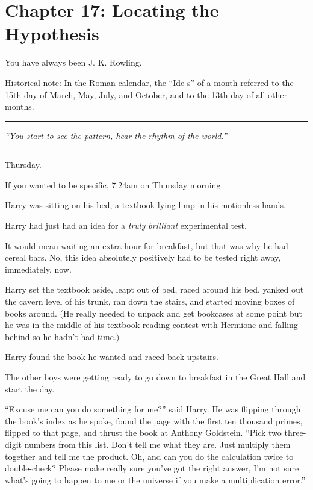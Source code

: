 \chapter{Chapter 17: Locating the Hypothesis}
You have always been J. K. Rowling.

Historical note: In the Roman calendar, the ``Ide s'' of a month referred to the 15th day of March, May, July, and October, and to the 13th day of all other months.

\begin{center}\rule{3in}{0.4pt}\end{center}

\emph{``You start to see the pattern, hear the rhythm of the world.''}

\begin{center}\rule{3in}{0.4pt}\end{center}

Thursday.

If you wanted to be specific, 7:24am on Thursday morning.

Harry was sitting on his bed, a textbook lying limp in his motionless hands.

Harry had just had an idea for a \emph{truly brilliant} experimental test.

It would mean waiting an extra hour for breakfast, but that was why he had cereal bars. No, this idea absolutely positively had to be tested right away, immediately, now.

Harry set the textbook aside, leapt out of bed, raced around his bed, yanked out the cavern level of his trunk, ran down the stairs, and started moving boxes of books around. (He really needed to unpack and get bookcases at some point but he was in the middle of his textbook reading contest with Hermione and falling behind so he hadn't had time.)

Harry found the book he wanted and raced back upstairs.

The other boys were getting ready to go down to breakfast in the Great Hall and start the day.

``Excuse me can you do something for me?'' said Harry. He was flipping through the book's index as he spoke, found the page with the first ten thousand primes, flipped to that page, and thrust the book at Anthony Goldstein. ``Pick two three-digit numbers from this list. Don't tell me what they are. Just multiply them together and tell me the product. Oh, and can you do the calculation twice to double-check? Please make really sure you've got the right answer, I'm not sure what's going to happen to me or the universe if you make a multiplication error.''

